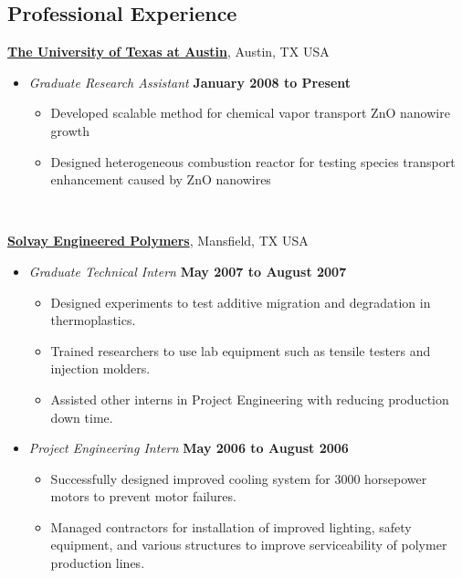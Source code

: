 \documentclass[line,margin]{res}
\begin{document}
\begin{resume}
\section{Professional Experience}

\href{http://www.utexas.edu/}{\textbf{The University of Texas at
    Austin}}, Austin, TX USA
\begin{itemize}
\item \textit{Graduate Research Assistant}%
  \hfill \textbf{January 2008 to Present}
  \begin{itemize}
  \item Developed scalable method for chemical vapor transport ZnO
    nanowire growth
  \item Designed heterogeneous combustion reactor for testing species
    transport enhancement caused by ZnO nanowires
  \end{itemize}~
\end{itemize}

\href{http://www.lyondellbasell.com/LandingPages/SolvayEngineeredPolymers}{\textbf{Solvay
    Engineered Polymers}}, Mansfield, TX USA 
\begin{itemize}
\item \textit{Graduate Technical Intern}%
  \hfill \textbf{May 2007 to August 2007}
  \begin{itemize}
  \item Designed experiments to test additive migration
    and degradation in thermoplastics.
  \item Trained researchers to use lab equipment such as tensile
    testers and injection molders.
  \item Assisted other interns in Project Engineering with
    reducing production down time.
  \end{itemize}
\item \textit{Project Engineering Intern}%
  \hfill \textbf{May 2006 to August 2006}
  \begin{itemize}
  \item Successfully designed improved cooling system for 3000
    horsepower motors to prevent motor failures.
  \item Managed contractors for installation of improved lighting,
    safety equipment, and various structures to improve serviceability
    of polymer production lines.
  \end{itemize}
\end{itemize}

\newpage{}


\end{resume}
\end{document}
